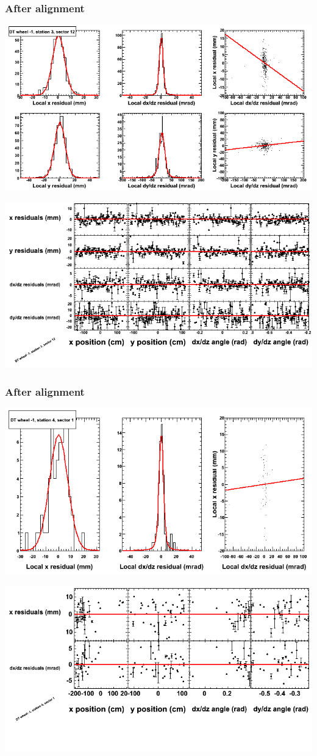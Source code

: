 \documentclass[compress]{beamer}
\begin{document}
\begin{frame}
\frametitle{After alignment}
\includegraphics[width=0.7\linewidth]{NOV4_fitfunctions/MBwhBst3sec12_bellcurves.png}

\includegraphics[width=0.7\linewidth]{NOV4_fitfunctions/MBwhBst3sec12_polynomials.png}
\end{frame}

\begin{frame}
\frametitle{After alignment}
\includegraphics[width=0.7\linewidth]{NOV4_fitfunctions/MBwhBst4sec01_bellcurves.png}

\includegraphics[width=0.7\linewidth]{NOV4_fitfunctions/MBwhBst4sec01_polynomials.png}
\end{frame}
\end{document}
